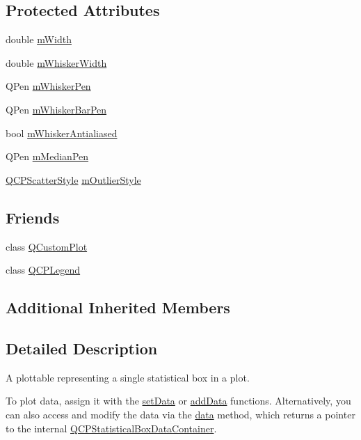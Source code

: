 \subsection*{Protected Attributes}
\begin{DoxyCompactItemize}
\item 
double \hyperlink{class_q_c_p_statistical_box_af365e40b0f706c3d76f857c7957f629d}{m\+Width}
\item 
double \hyperlink{class_q_c_p_statistical_box_a4d166474f845d5db626e8b11a0815a6f}{m\+Whisker\+Width}
\item 
Q\+Pen \hyperlink{class_q_c_p_statistical_box_a25b7552499f0f090fcff02858b2265a5}{m\+Whisker\+Pen}
\item 
Q\+Pen \hyperlink{class_q_c_p_statistical_box_aa719b1d722a9f82364df1497a6dc1da8}{m\+Whisker\+Bar\+Pen}
\item 
bool \hyperlink{class_q_c_p_statistical_box_a714bb91efb423c7b7ec3a6a50c2910b9}{m\+Whisker\+Antialiased}
\item 
Q\+Pen \hyperlink{class_q_c_p_statistical_box_a1af5b601049c575f778ae270f40c9443}{m\+Median\+Pen}
\item 
\hyperlink{class_q_c_p_scatter_style}{Q\+C\+P\+Scatter\+Style} \hyperlink{class_q_c_p_statistical_box_ae102e4187e1e6ba1f2df0f622b5171a4}{m\+Outlier\+Style}
\end{DoxyCompactItemize}
\subsection*{Friends}
\begin{DoxyCompactItemize}
\item 
class \hyperlink{class_q_c_p_statistical_box_a1cdf9df76adcfae45261690aa0ca2198}{Q\+Custom\+Plot}
\item 
class \hyperlink{class_q_c_p_statistical_box_a8429035e7adfbd7f05805a6530ad5e3b}{Q\+C\+P\+Legend}
\end{DoxyCompactItemize}
\subsection*{Additional Inherited Members}


\subsection{Detailed Description}
A plottable representing a single statistical box in a plot. 



To plot data, assign it with the \hyperlink{class_q_c_p_statistical_box_a08a6da55822bad825ee25a8069b9b52f}{set\+Data} or \hyperlink{class_q_c_p_statistical_box_a9a8739c5b8291db8fd839e892fc8f478}{add\+Data} functions. Alternatively, you can also access and modify the data via the \hyperlink{class_q_c_p_statistical_box_a728e501413eaf191544014173d52dfbc}{data} method, which returns a pointer to the internal \hyperlink{qcustomplot_8h_a8b773c0c35f8f924701ced6e9915e4c7}{Q\+C\+P\+Statistical\+Box\+Data\+Container}.


